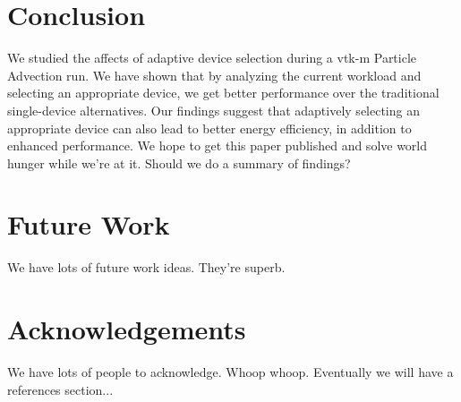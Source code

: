 \documentclass{IEEEtran}
\begin{document}
\section{Conclusion}
We studied the affects of adaptive device selection during a vtk-m Particle Advection run. 
%
We have shown that by analyzing the current workload and selecting an appropriate device, we get better performance over the traditional single-device alternatives. 
%
Our findings suggest that adaptively selecting an appropriate device can also lead to better energy efficiency, in addition to enhanced performance. 
%
We hope to get this paper published and solve world hunger while we're at it.
%
Should we do a summary of findings?
%
\section{Future Work}
We have lots of future work ideas. 
%
They're superb.
%
\section{Acknowledgements}
We have lots of people to acknowledge. 
%
Whoop whoop.
%
Eventually we will have a references section...
%
\end{document}
